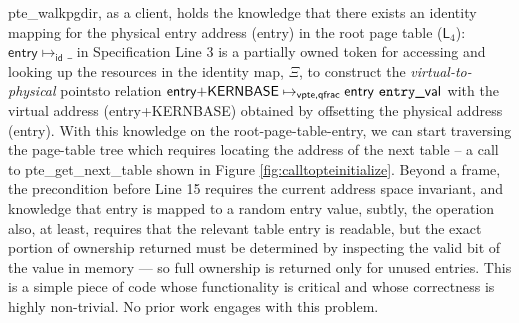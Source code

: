\textsf{pte\_walkpgdir}, as a client, holds the knowledge that there exists an identity mapping for the physical entry address (\textsf{entry}) in the root page table ($\textsf{L}_{4}$):  $\mathsf{entry} \mapsto_{\textsf{id}} \textsf{\_}$ in Specification Line 3 is a partially owned token for accessing and looking up the resources in the identity map, $\Xi$, to construct the \textit{virtual-to-physical} pointsto relation $\textsf{entry+KERNBASE} \mapsto_{\textsf{vpte,qfrac}} \textsf{entry \texttt{entry}\_val}$ with the virtual address (\textsf{entry+KERNBASE}) obtained by offsetting the physical address (\textsf{entry}). With this knowledge on the root-page-table-entry, we can start traversing the page-table tree which requires locating the address of the next table -- a call to \textsf{pte\_get\_next\_table} shown in Figure \ref{fig:calltopteinitialize}. 
Beyond a frame, the precondition before Line 15 requires the current address space invariant, and knowledge that \textsf{entry} is mapped to a random entry value, subtly, the operation also, at least, requires that the relevant table entry is readable, but the exact portion of ownership returned must be determined by inspecting the valid bit
of the value in memory --- so full ownership is returned only for unused entries.
This is a simple piece of code whose functionality is critical and whose correctness is highly non-trivial. No prior work engages with this problem.



%



